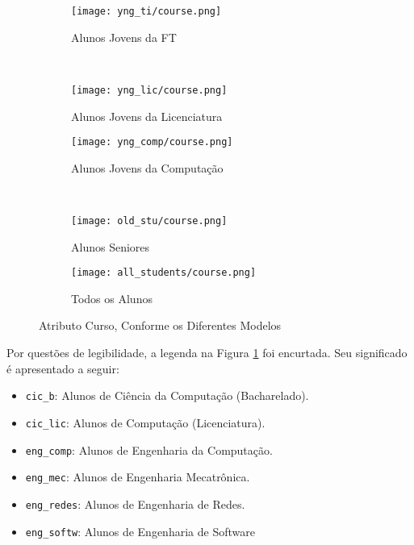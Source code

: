 \clearpage
\begin{figure}[!ht]
    \centering
    \begin{subfigure}[b]{0.48\textwidth}
        \centering
        \texttt{[image: yng\_ti/course.png]}
        \caption{Alunos Jovens da FT}
    \end{subfigure}
    ~
    \begin{subfigure}[b]{0.48\textwidth}
        \centering
        \texttt{[image: yng\_lic/course.png]}
        \caption{Alunos Jovens da Licenciatura}
    \end{subfigure}

    \begin{subfigure}[b]{0.48\textwidth}
        \centering
        \texttt{[image: yng\_comp/course.png]}
        \caption{Alunos Jovens da Computação}
    \end{subfigure}
    ~
    \begin{subfigure}[b]{0.48\textwidth}
        \centering
        \texttt{[image: old\_stu/course.png]}
        \caption{Alunos Seniores}
    \end{subfigure}

    \begin{subfigure}[b]{0.48\textwidth}
        \centering
        \texttt{[image: all\_students/course.png]}
        \caption{Todos os Alunos}
    \end{subfigure}
    \caption{Atributo Curso, Conforme os Diferentes Modelos}
    \label{course_graph}
\end{figure}

Por questões de legibilidade, a legenda na Figura \ref{course_graph} foi encurtada.
Seu significado é apresentado a seguir: 
\begin{itemize}
    \item \texttt{cic\_b}: Alunos de Ciência da Computação (Bacharelado).
    \item \texttt{cic\_lic}: Alunos de Computação (Licenciatura).
    \item \texttt{eng\_comp}: Alunos de Engenharia da Computação.
    \item \texttt{eng\_mec}: Alunos de Engenharia Mecatrônica.
    \item \texttt{eng\_redes}: Alunos de Engenharia de Redes. 
    \item \texttt{eng\_softw}: Alunos de Engenharia de Software
\end{itemize}

